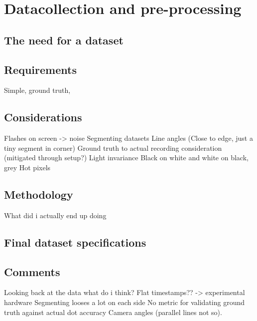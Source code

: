\chapter{Datacollection and pre-processing}

\section{The need for a dataset}

\section{Requirements}
Simple, ground truth, 

\section{Considerations}
Flashes on screen -> noise
Segmenting datasets
Line angles (Close to edge, just a tiny segment in corner)
Ground truth to actual recording consideration (mitigated through setup?)
Light invariance
Black on white and white on black, grey
Hot pixels

\section{Methodology}
What did i actually end up doing

\section{Final dataset specifications}


\section{Comments}
Looking back at the data what do i think?
Flat timestamps?? -> experimental hardware
Segmenting looses a lot on each side
No metric for validating ground truth against actual dot accuracy
Camera angles (parallel lines not so).




